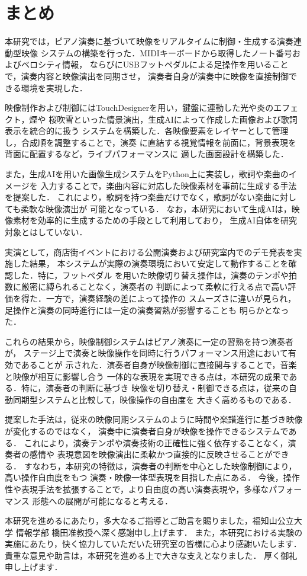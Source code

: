 \section{まとめ }
本研究では，ピアノ演奏に基づいて映像をリアルタイムに制御・生成する演奏連動型映像
システムの構築を行った．MIDIキーボードから取得したノート番号およびベロシティ情報，
ならびにUSBフットペダルによる足操作を用いることで，演奏内容と映像演出を同期させ，
演奏者自身が演奏中に映像を直接制御できる環境を実現した．

映像制作および制御にはTouchDesignerを用い，鍵盤に連動した光や炎のエフェクト，煙や
桜吹雪といった情景演出，生成AIによって作成した画像および歌詞表示を統合的に扱う
システムを構築した．各映像要素をレイヤーとして管理し，合成順を調整することで，演奏
に直結する視覚情報を前面に，背景表現を背面に配置するなど，ライブパフォーマンスに
適した画面設計を構築した．

また，生成AIを用いた画像生成システムをPython上に実装し，歌詞や楽曲のイメージを
入力することで，楽曲内容に対応した映像素材を事前に生成する手法を提案した．
これにより，歌詞を持つ楽曲だけでなく，歌詞がない楽曲に対しても柔軟な映像演出が
可能となっている．
なお，本研究において生成AIは，映像素材を効率的に生成するための手段として利用しており，
生成AI自体を研究対象とはしていない．

実演として，商店街イベントにおける公開演奏および研究室内でのデモ発表を実施した結果，
本システムが実際の演奏環境において安定して動作することを確認した．特に，フットペダル
を用いた映像切り替え操作は，演奏のテンポや拍数に厳密に縛られることなく，演奏者の
判断によって柔軟に行える点で高い評価を得た．一方で，演奏経験の差によって操作の
スムーズさに違いが見られ，足操作と演奏の同時進行には一定の演奏習熟が影響することも
明らかとなった．

これらの結果から，映像制御システムはピアノ演奏に一定の習熟を持つ演奏者が，
ステージ上で演奏と映像操作を同時に行うパフォーマンス用途において有効であることが
示された．演奏者自身が映像制御に直接関与することで，音楽と映像が相互に影響し合う
一体的な表現を実現できる点は，本研究の成果である．特に，演奏者の判断に基づき
映像を切り替え・制御できる点は，従来の自動同期型システムと比較して，映像操作の自由度を
大きく高めるものである．

提案した手法は，従来の映像同期システムのように時間や楽譜進行に基づき映像が変化するのではなく，
演奏中に演奏者自身が映像を操作できるシステムである．
これにより，演奏テンポや演奏技術の正確性に強く依存することなく，演奏者の感情や
表現意図を映像演出に柔軟かつ直接的に反映させることができる．
すなわち，本研究の特徴は，演奏者の判断を中心とした映像制御により，高い操作自由度をもつ
演奏・映像一体型表現を目指した点にある．
今後，操作性や表現手法を拡張することで，より自由度の高い演奏表現や，多様なパフォーマンス
形態への展開が可能になると考える．

\vspace{1\baselineskip}
\acknowledgment
本研究を進めるにあたり，多大なるご指導とご助言を賜りました，福知山公立大学 情報学部 
橋田准教授へ深く感謝申し上げます．
また，本研究における実験の実施にあたり，快く協力していただいた研究室の皆様に心より感謝いたします．
貴重な意見や助言は，本研究を進める上で大きな支えとなりました．
厚く御礼申し上げます．
